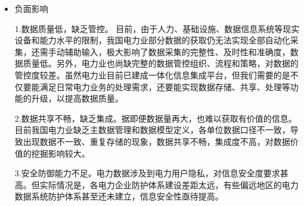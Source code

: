 \documentclass{article}
\begin{document}
\begin{enumerate}
\begin{itemize}
        \item 负面影响 \par
        \hspace{2em} 1.数据质量低，缺乏管控。
        目前，由于人力、基础设施、数据信息系统等现实设备和能力水平的限制，我国电力业部分数据的获取仍无法实现全部自动化采集，还需手动辅助输入，极大影响了数据采集的完整性、及时性和准确度，数据质量低。另外，电力业也尚缺完整的数据管控组织、流程和策略，对数据的管控度较差。虽然电力业目前已建成一体化信息集成平台，但我们需要的是不仅要能满足日常电力业务的处理需求，还要能实现数据存储、共享、处理等功能的升级，以提高数据质量。 \par
        \hspace{2em} 2.数据共享不畅，缺乏集成。据即便数据量再大，也难以获取有价值的信息。目前我国电力业缺乏主数据管理和数据模型定义，各单位数据口径不一致，导致出现数据不一致、重复存储的现象，数据共享不畅，集成度不高，对数据价值的挖掘影响较大。 \par
        \hspace{2em} 3.安全防御能力不足。电力数据涉及到电力用户隐私，对信息安全度要求甚高。但实际情况是，各电力企业防护体系建设差距太远，有些偏远地区的电力数据系统防护体系甚至还未建立，信息安全性亟待提高。

    \end{itemize}
  
  
\end{enumerate}
\end{document}
